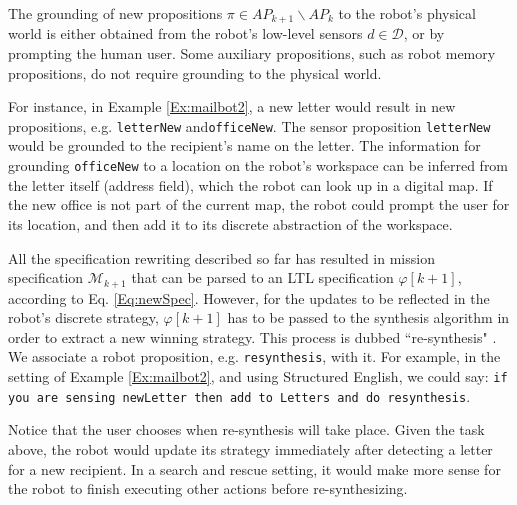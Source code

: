 \begin{myAssumption}
	The grounding \cite{Grounding2013} of new propositions 
$\pi \in AP_{k+1} \backslash AP_k$ to the robot's physical world is either obtained from the robot's low-level sensors $d \in \mathcal{D}$, or by prompting the human user.
Some auxiliary propositions, such as robot memory propositions, do not require grounding to the physical world.
\end{myAssumption}

For instance, in Example \ref{Ex:mailbot2}, a new letter would result in new propositions, e.g. \texttt{letterNew} and\texttt{officeNew}. The sensor proposition \texttt{letterNew} would be grounded to the recipient's name on the letter. The information for grounding \texttt{officeNew} to a location on the robot's workspace can be inferred from the letter itself (address field), which the robot can look up in a digital map. If the new office is not part of the current map, the robot could prompt the user for its location, and then add it to its discrete abstraction of the workspace.

All the specification rewriting described so far has resulted in mission specification $\mathcal{M}_{k+1}$ that can be parsed to an LTL specification $\varphi [k+1]$, according to Eq. \eqref{Eq:newSpec}. However, for the updates to be reflected in the robot's discrete strategy, $\varphi [k+1]$ has to be passed to the synthesis algorithm in order to extract a new winning strategy. This process is dubbed ``re-synthesis" \cite{BingxinRSS2012}. We associate a robot proposition, e.g. \texttt{resynthesis}, with it. For example, in the setting of Example \ref{Ex:mailbot2}, and using Structured English, we could say:
\texttt{if you are sensing newLetter then add to Letters and do resynthesis}. 

Notice that the user chooses when re-synthesis will take place. Given the task above, the robot would update its strategy immediately after detecting a letter for a new recipient. In a search and rescue setting, it would make more sense for the robot to finish executing other actions before re-synthesizing.

